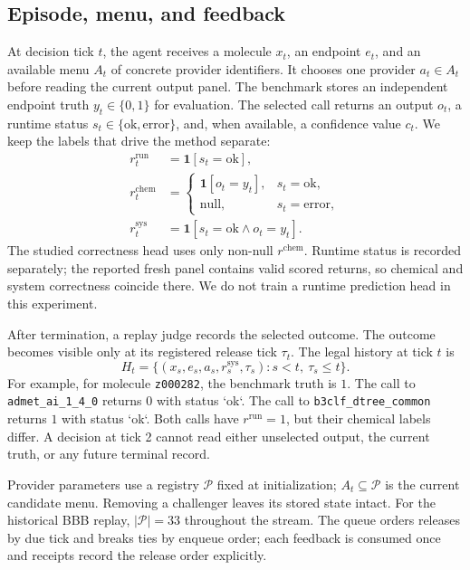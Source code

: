 \documentclass[sigconf,anonymous]{aamas}
\begin{document}
\subsection{Episode, menu, and feedback}
At decision tick $t$, the agent receives a molecule $x_t$, an endpoint $e_t$, and an available menu $A_t$ of concrete provider identifiers. It chooses one provider $a_t\in A_t$ before reading the current output panel. The benchmark stores an independent endpoint truth $y_t\in\{0,1\}$ for evaluation. The selected call returns an output $o_t$, a runtime status $s_t\in\{\mathrm{ok},\mathrm{error}\}$, and, when available, a confidence value $c_t$. We keep the labels that drive the method separate:
$$
\begin{aligned}
 r_t^{\mathrm{run}}&=\mathbf{1}[s_t=\mathrm{ok}],\\
 r_t^{\mathrm{chem}}&=\begin{cases}\mathbf{1}[o_t=y_t],&s_t=\mathrm{ok},\\ \mathrm{null},&s_t=\mathrm{error},\end{cases}\\
 r_t^{\mathrm{sys}}&=\mathbf{1}[s_t=\mathrm{ok}\land o_t=y_t].
\end{aligned}
$$
The studied correctness head uses only non-null $r^{\mathrm{chem}}$. Runtime status is recorded separately; the reported fresh panel contains valid scored returns, so chemical and system correctness coincide there. We do not train a runtime prediction head in this experiment.

After termination, a replay judge records the selected outcome. The outcome becomes visible only at its registered release tick $\tau_t$. The legal history at tick $t$ is
$$
H_t=\{(x_s,e_s,a_s,r_s^{\mathrm{sys}},\tau_s):s<t,\ \tau_s\leq t\}.
$$
For example, for molecule \texttt{z000282}, the benchmark truth is $1$. The call to \texttt{admet\_ai\_1\_4\_0} returns $0$ with status `ok`. The call to \texttt{b3clf\_dtree\_common} returns $1$ with status `ok`. Both calls have $r^{\mathrm{run}}=1$, but their chemical labels differ. A decision at tick 2 cannot read either unselected output, the current truth, or any future terminal record.

Provider parameters use a registry $\mathcal P$ fixed at initialization; $A_t\subseteq\mathcal P$ is the current candidate menu. Removing a challenger leaves its stored state intact. For the historical BBB replay, $|\mathcal P|=33$ throughout the stream. The queue orders releases by due tick and breaks ties by enqueue order; each feedback is consumed once and receipts record the release order explicitly.
\end{document}

